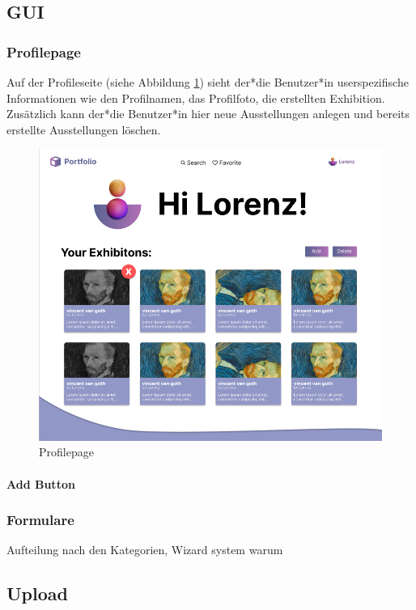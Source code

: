 \subsection{GUI}
\subsubsection{Profilepage}
Auf der Profileseite (siehe Abbildung \ref{fig:impl:sign:profile}) sieht der*die Benutzer*in userspezifische Informationen wie den Profilnamen, das Profilfoto, die erstellten Exhibition. Zusätzlich kann der*die Benutzer*in hier neue Ausstellungen anlegen und bereits erstellte Ausstellungen löschen. 

\begin{figure}
  \centering
  \includegraphics[scale=0.5]{pics/profilepage.png}
  \caption{Profilepage}
  \label{fig:impl:sign:profile}
\end{figure}

\paragraph*{Add Button}

\subsubsection{Formulare}
Aufteilung nach den Kategorien, Wizard system warum 

\subsection{Upload}

